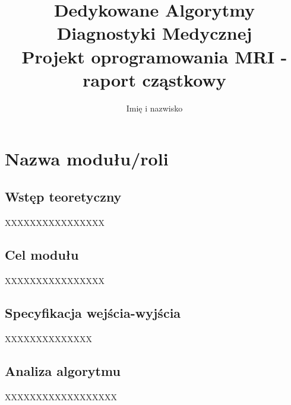 \documentclass[12]{article}
\title{Dedykowane Algorytmy Diagnostyki Medycznej\\ \small{Projekt oprogramowania MRI - raport cząstkowy}}
\author{Imię i nazwisko}
\begin{document}
	
	\maketitle
	\newpage
	\tableofcontents
	\newpage
		\section{Nazwa modułu/roli}
		\subsection{Wstęp teoretyczny}
		\paragraph{}
		XXXXXXXXXXXXXXXX
		\subsection{Cel modułu}
		\paragraph{}
		XXXXXXXXXXXXXXXX
		\subsection{Specyfikacja wejścia-wyjścia}
		\paragraph{}
		XXXXXXXXXXXXXX
		\subsection{Analiza algorytmu}
		\paragraph{}
		XXXXXXXXXXXXXXXXXX
	\newpage
	\begin{thebibliography}{99}
		
	\end{thebibliography}
\end{document}
